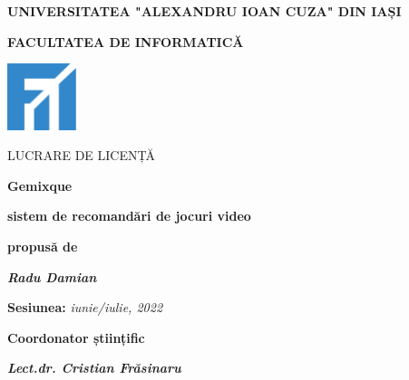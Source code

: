 \documentclass[12pt,a4paper]{report}
\begin{document}

\begin{titlepage}
	\centering
	{\scshape\large \textbf{UNIVERSITATEA "ALEXANDRU IOAN CUZA" DIN IAȘI} \par}
	\vspace{0.5cm}
	{\scshape\Large \textbf{FACULTATEA DE INFORMATICĂ}\par}
	\vspace{2cm}
	\includegraphics[width=0.15\textwidth]{logo-fii}\par\vspace{1cm}
	{\scshape\normalsize LUCRARE DE LICENȚĂ\par}
	\vspace{1cm}
	{\huge\bfseries Gemixque\par}
	\vspace{1cm}
	{\normalsize \textbf{sistem de recomandări de jocuri video}\par}
	\vspace{1.5cm}
	{\normalsize \textbf{propusă de}\par}
	\vspace{1cm}
	{\Large\itshape\textbf {Radu Damian}\par}
	\vspace{2cm}
	{\normalsize \textbf{Sesiunea:} \textit{iunie/iulie, 2022}\par}
	\vspace{1cm}
	{\normalsize \textbf{Coordonator științific}\par}
	\vspace{0.5cm}
	{\Large\itshape\textbf {Lect.dr. Cristian Frăsinaru}\par}
\end{titlepage}
\end{document}
